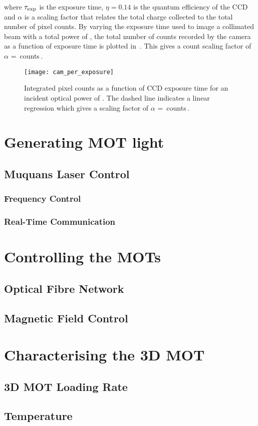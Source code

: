 where \(\tau_\textnormal{exp}\) is the exposure time, \(\eta = 0.14\) is the quantum efficiency of the CCD and \(\alpha\) is a scaling factor that relates the total charge collected to the total number of pixel counts. By varying the exposure time used to image a collimated beam with a total power of , the total number of counts recorded by the camera as a function of exposure time is plotted in~. This gives a count scaling factor of \(\alpha\) = \,counts\,\sivalue{}{\per\micro\second\per\micro\watt}.
\begin{figure}
    \centering
    \texttt{[image: cam\_per\_exposure]}
    \caption[Integrated pixel counts as a function of CCD exposure time.]{Integrated pixel counts as a function of CCD exposure time for an incident optical power of . The dashed line indicates a linear regression which gives a scaling factor of \(\alpha\) = \,counts\,\sivalue{}{\per\micro\second\per\micro\watt}.}
    \label{fig:camera_counts}
\end{figure}
\section{Generating MOT light}
\subsection{Muquans Laser Control}
\subsubsection{Frequency Control}
\subsubsection{Real-Time Communication} \label{subsec:muquans_comm}

\section{Controlling the MOTs}
\subsection{Optical Fibre Network}
\subsection{Magnetic Field Control}

\section{Characterising the 3D MOT}
\subsection{3D MOT Loading Rate}\label{subsec:loading_rate}
\subsection{Temperature}

